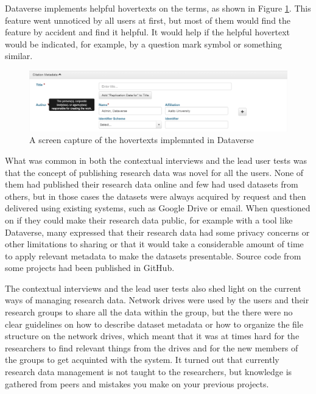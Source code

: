 Dataverse implements helpful hovertexts on the terms, as shown in Figure
\ref{fig:hovertext}. This feature went unnoticed by all users at first, but
most of them would find the feature by accident and find it helpful. It would
help if the helpful hovertext would be indicated, for example, by a question
mark symbol or something similar.

\begin{figure}
    \begin{centering}
        \includegraphics[width=\textwidth]{images/hovertext}
    \end{centering}
    \caption{A screen capture of the hovertexts implemnted in Dataverse}
    \label{fig:hovertext}
\end{figure}

What was common in both the contextual interviews and the lead user tests was
that the concept of publishing research data was novel for all the users. None
of them had published their research data online and few had used datasets from others,
but in those cases the datasets were always acquired by request and then
delivered using existing systems, such as Google Drive or email. When 
questioned on if they could make their research data public, for example with a tool
like Dataverse, many expressed that their research data had some privacy
concerns or other limitations to sharing or that it would take a considerable
amount of time to apply relevant metadata to make the datasets presentable.
Source code from some projects had been published in GitHub.

The contextual interviews and the lead user tests also shed light on the
current ways of managing research data. Network drives were used by the
users and their research groups to share all the data within the group, but
the there were no clear guidelines on how to describe dataset metadata or how
to organize the file structure on the network drives, which meant that it was
at times hard for the researchers to find relevant things from the drives and
for the new members of the groups to get acquinted with the system. It turned
out that currently research data management is not taught to the researchers,
but knowledge is gathered from peers and mistakes you make on your previous
projects.


